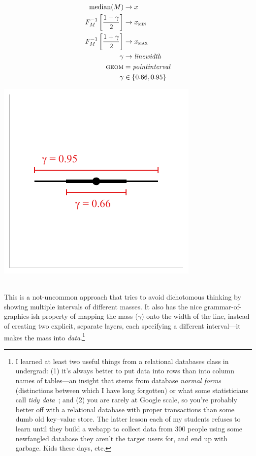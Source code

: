 \documentclass[journal]{vgtc}                     %
\newcommand{\equationfigure}[2]{%
\noindent
\begin{minipage}{.5\columnwidth}
\setlength{\abovedisplayskip}{0pt}
\setlength{\belowdisplayskip}{0pt}
#1\end{minipage}%
\begin{minipage}{.4\columnwidth}\centering #2 \end{minipage}%
\vspace{.5\belowdisplayskip}\\
}
\begin{document}
\equationfigure{
\begin{align*}
\operatorname{median}(M) &\rightarrow x\\
F_M^{-1}\left[\frac{1 - \gamma}{2}\right] &\rightarrow x_\textsc{min}\\
F_M^{-1}\left[\frac{1 + \gamma}{2}\right] &\rightarrow x_\textsc{max}\\
\gamma &\rightarrow \mathit{linewidth}\\
\textsc{geom} &= \mathit{pointinterval}\\
\gamma &\in \{0.66, 0.95\}
\end{align*}
}{\includegraphics[width=1.2\columnwidth]{figs/3-stat_pointinterval_linewidth.pdf}}
This is a not-uncommon approach that tries to avoid dichotomous thinking by showing multiple intervals of different masses. It also has the nice grammar-of-graphics-ish property of mapping the mass ($\gamma$) onto the width of the line, instead of creating two explicit, separate layers, each specifying a different interval---it makes the mass into \textit{data}.\footnote{I learned at least two useful things from a relational databases class in undergrad: (1) it's always better to put data into rows than into column names of tables---an insight that stems from database \textit{normal forms}~\cite{codd1990relational} (distinctions between which I have long forgotten) or what some statisticians call \textit{tidy data}~\cite{hadley2014tidy}; and (2) you are rarely at Google scale, so you're probably better off with a relational database with proper transactions than some dumb old key--value store. The latter lesson each of my students refuses to learn until they build a webapp to collect data from 300 people using some newfangled database they aren't the target users for, and end up with garbage. Kids these days, etc.}
\end{document}
